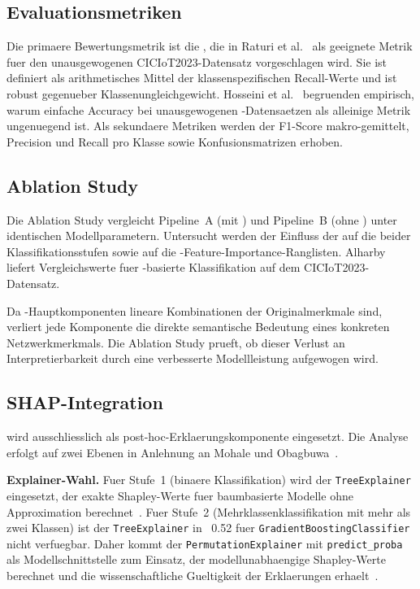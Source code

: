 \subsection{Evaluationsmetriken}

Die primaere Bewertungsmetrik ist die \ba{}, die in Raturi et al.\ \cite{raturi2026exploratory}
als geeignete Metrik fuer den unausgewogenen CICIoT2023-Datensatz vorgeschlagen wird.
Sie ist definiert als arithmetisches Mittel der klassenspezifischen Recall-Werte und ist robust
gegenueber Klassenungleichgewicht.
Hosseini et al.\ \cite{hosseini2025imbalance} begruenden empirisch, warum einfache Accuracy
bei unausgewogenen \ids{}-Datensaetzen als alleinige Metrik ungenuegend ist.
Als sekundaere Metriken werden der F1-Score makro-gemittelt, Precision und Recall pro Klasse
sowie Konfusionsmatrizen erhoben.

\subsection{Ablation Study}

Die Ablation Study vergleicht Pipeline~A (mit \pca{}) und Pipeline~B (ohne \pca{}) unter
identischen Modellparametern.
Untersucht werden der Einfluss der \pca{} auf die \ba{} beider Klassifikationsstufen sowie
auf die \shap{}-Feature-Importance-Ranglisten.
Alharby~\cite{alharby2025ciciot} liefert Vergleichswerte fuer \pca{}-basierte Klassifikation
auf dem CICIoT2023-Datensatz.

Da \pca{}-Hauptkomponenten lineare Kombinationen der Originalmerkmale sind, verliert jede
Komponente die direkte semantische Bedeutung eines konkreten Netzwerkmerkmals.
Die Ablation Study prueft, ob dieser Verlust an Interpretierbarkeit durch eine verbesserte
Modellleistung aufgewogen wird.

\subsection{SHAP-Integration}

\shap{} wird ausschliesslich als post-hoc-Erklaerungskomponente eingesetzt.
Die Analyse erfolgt auf zwei Ebenen in Anlehnung an Mohale und Obagbuwa~\cite{mohale2025xai}.

\textbf{Explainer-Wahl.}
Fuer Stufe~1 (binaere Klassifikation) wird der \texttt{TreeExplainer} eingesetzt, der
exakte Shapley-Werte fuer baumbasierte Modelle ohne Approximation
berechnet~\cite{mohale2025xai}.
Fuer Stufe~2 (Mehrklassenklassifikation mit mehr als zwei Klassen) ist der
\texttt{TreeExplainer} in \shap{}~0.52 fuer \texttt{GradientBoostingClassifier} nicht
verfuegbar.
Daher kommt der \texttt{PermutationExplainer} mit \texttt{predict\_proba} als
Modellschnittstelle zum Einsatz, der modellunabhaengige Shapley-Werte berechnet und die
wissenschaftliche Gueltigkeit der Erklaerungen
erhaelt~\cite{mohale2025xai,hermosilla2025xai_forensic}.

